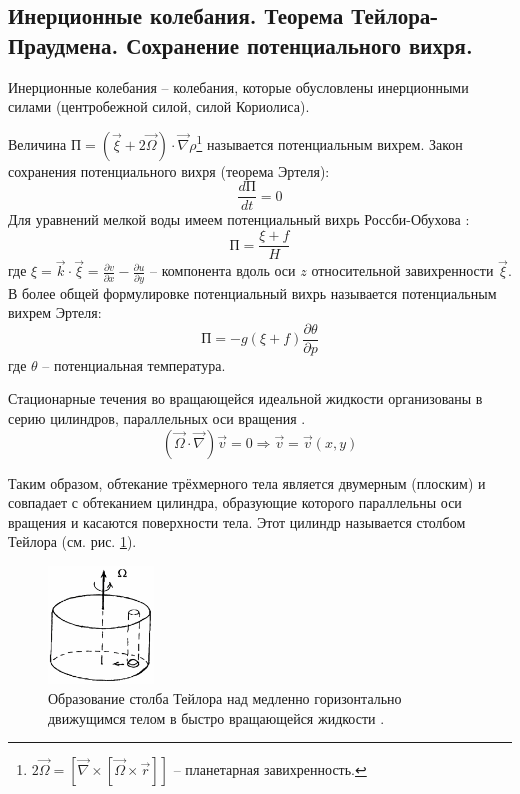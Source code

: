 \subsection{Инерционные колебания. Теорема Тейлора-Праудмена. Сохранение потенциального вихря.}
Инерционные колебания -- колебания, которые обусловлены инерционными силами (центробежной силой, силой Кориолиса).

Величина $\text{П}=(\vec{\xi}+2\vec{\Omega})\cdot\vec{\nabla}\rho$\footnote{$2\vec{\Omega}=\left[\vec{\nabla}\times\left[\vec{\Omega}\times\vec{r}\right]\right]$ -- планетарная завихренность.} называется потенциальным вихрем.
Закон сохранения потенциального вихря (теорема Эртеля):
\begin{equation}\label{eq-3-6-1}
\frac{d\text{П}}{dt}=0
\end{equation}
Для уравнений мелкой воды имеем потенциальный вихрь Россби-Обухова \cite{Должанский-2006}:
\begin{equation}
\text{П}=\frac{\xi+f}{H}
\end{equation}
где $\xi=\vec{k}\cdot\vec{\xi}=\frac{\partial v}{\partial x}-\frac{\partial u}{\partial y}$ -- компонента вдоль оси $z$ относительной завихренности $\vec{\xi}$.
В более общей формулировке потенциальный вихрь называется потенциальным вихрем Эртеля:
\begin{equation}
\text{П}=-g(\xi+f)\frac{\partial\theta}{\partial p}
\end{equation}
где $\theta$ -- потенциальная температура.

\begin{theorem*}
Стационарные течения во вращающейся идеальной жидкости организованы в серию цилиндров, параллельных оси вращения \normalfont\cite{Гольдштейн-Городцов-2000}.
\begin{equation}
\left(\vec{\Omega}\cdot\vec{\nabla}\right)\vec{v}=0\Rightarrow\vec{v}=\vec{v}(x, y)
\end{equation}
\end{theorem*}
Таким образом, обтекание трёхмерного тела является двумерным (плоским) и совпадает с обтеканием цилиндра, образующие которого параллельны оси вращения и касаются поверхности тела.
Этот цилиндр называется столбом Тейлора (см. рис. \ref{fig:stolb_teilora}).

\begin{figure}[!ht]
\centering
\includegraphics[width=0.25\textwidth]{images/stolb_teilora.png}
\caption{Образование столба Тейлора над медленно горизонтально движущимся телом в быстро вращающейся жидкости \cite{Гольдштейн-Городцов-2000}.}\label{fig:stolb_teilora}
\end{figure}
